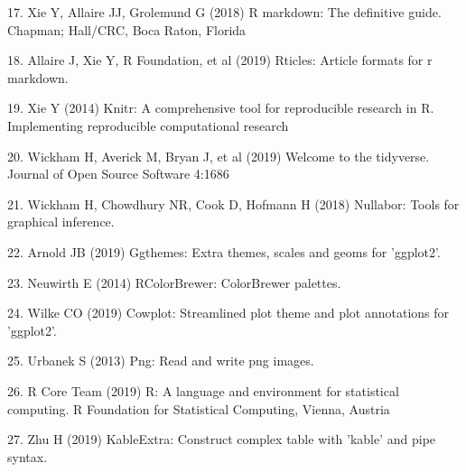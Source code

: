 \documentclass[conference,final,]{IEEEtran}
\begin{document}
\leavevmode\hypertarget{ref-rmarkdown}{}%
17. Xie Y, Allaire JJ, Grolemund G (2018) R markdown: The definitive guide. Chapman; Hall/CRC, Boca Raton, Florida

\leavevmode\hypertarget{ref-rticles}{}%
18. Allaire J, Xie Y, R Foundation, et al (2019) Rticles: Article formats for r markdown.

\leavevmode\hypertarget{ref-knitr}{}%
19. Xie Y (2014) Knitr: A comprehensive tool for reproducible research in R. Implementing reproducible computational research

\leavevmode\hypertarget{ref-tidyverse}{}%
20. Wickham H, Averick M, Bryan J, et al (2019) Welcome to the tidyverse. Journal of Open Source Software 4:1686

\leavevmode\hypertarget{ref-nullabor}{}%
21. Wickham H, Chowdhury NR, Cook D, Hofmann H (2018) Nullabor: Tools for graphical inference.

\leavevmode\hypertarget{ref-ggthemes}{}%
22. Arnold JB (2019) Ggthemes: Extra themes, scales and geoms for 'ggplot2'.

\leavevmode\hypertarget{ref-RColorBrewer}{}%
23. Neuwirth E (2014) RColorBrewer: ColorBrewer palettes.

\leavevmode\hypertarget{ref-cowplot}{}%
24. Wilke CO (2019) Cowplot: Streamlined plot theme and plot annotations for 'ggplot2'.

\leavevmode\hypertarget{ref-png}{}%
25. Urbanek S (2013) Png: Read and write png images.

\leavevmode\hypertarget{ref-grid}{}%
26. R Core Team (2019) R: A language and environment for statistical computing. R Foundation for Statistical Computing, Vienna, Austria

\leavevmode\hypertarget{ref-kableExtra}{}%
27. Zhu H (2019) KableExtra: Construct complex table with 'kable' and pipe syntax.
\end{document}
